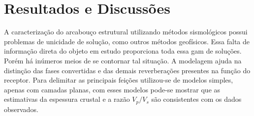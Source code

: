 \chapter{Resultados e Discussões}	

A caracterização do arcabouço estrutural utilizando métodos sismológicos possui problemas de unicidade de solução, como outros métodos geofísicos.  Essa falta de informação direta do objeto em estudo proporciona toda essa gam de soluções. Porém há inúmeros meios de se contornar tal situação. A modelagem ajuda na distinção das fases convertidas e das demais reverberações presentes na função do receptor.
Para delimitar as principais feições utilizou-se de modelos simples, apenas com camadas planas, com esses modelos pode-se mostrar que as estimativas da espessura crustal e a razão $V_{p}/V_{s}$ são consistentes com os dados observados.
